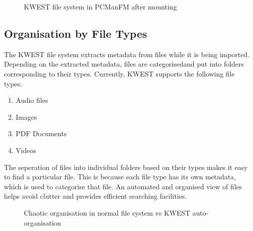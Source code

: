 \begin{figure}[htb]
\centering
\setlength\fboxsep{0pt}
\setlength\fboxrule{0.5pt}
\caption{KWEST file system in PCManFM after mounting}
\label{fig:dfd0}
\end{figure}
\newpage
\subsection{Organisation by File Types}
The KWEST file system extracts metadata from files while it is being imported. Depending on the extracted metadata, files are categorisedand put into folders corresponding to their types. Currently, KWEST supports the following file types:
\begin{enumerate}
\item Audio files
\item Images
\item PDF Documents
\item Videos
\end{enumerate}
The seperation of files into individual folders based on their types makes it easy to find a particular file. This is because each file type has its own metadata, which is used to categorise that file. An automated and organised view of files helps avoid clutter and provides efficient searching facilities.
\begin{figure}[htb]
\centering
\setlength\fboxsep{0pt}
\setlength\fboxrule{0.5pt}
\caption{Chaotic organisation in normal file system vs KWEST auto-organisation}
\label{fig:dfd0}
\end{figure}

